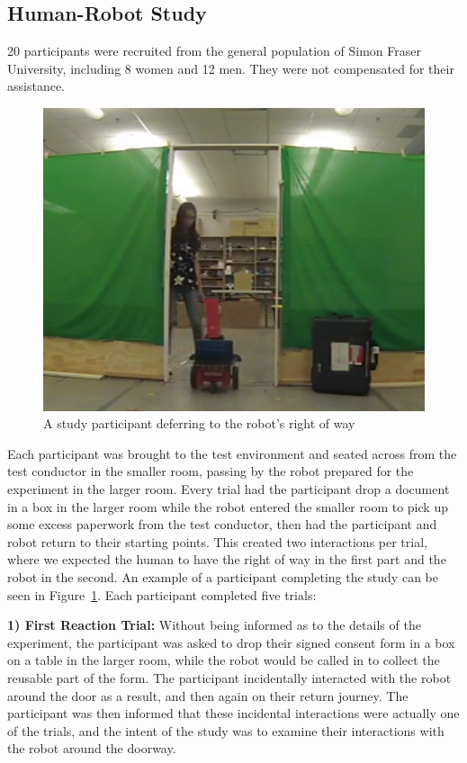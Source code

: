 \documentclass[letterpaper, 10 pt, conference]{ieeeconf}  %
\begin{document}
\subsection{Human-Robot Study}

20 participants were recruited from the general population of Simon Fraser University, including 8 women and 12 men. They were not compensated for their assistance.

     \begin{figure}
      \centering
      \includegraphics[scale=0.5]{test_example.png}
      \caption{A study participant deferring to the robot's right of way}
      \label{fig:Example}
   \end{figure}

Each participant was brought to the test environment and seated across from the test conductor in the smaller room, passing by the robot prepared for the experiment in the larger room. Every trial had the participant drop a document in a box in the larger room while the robot entered the smaller room to pick up some excess paperwork from the test conductor, then had the participant and robot return to their starting points. This created two interactions per trial, where we expected the human to have the right of way in the first part and the robot in the second. An example of a participant completing the study can be seen in Figure~\ref{fig:Example}. Each participant completed five trials:

\textbf{1) First Reaction Trial:} Without being informed as to the details of the experiment, the participant was asked to drop their signed consent form in a box on a table in the larger room, while the robot would be called in to collect the reusable part of the form. The participant incidentally interacted with the robot around the door as a result, and then again on their return journey. The participant was then informed that these incidental interactions were actually one of the trials, and the intent of the study was to examine their interactions with the robot around the doorway.
\end{document}
